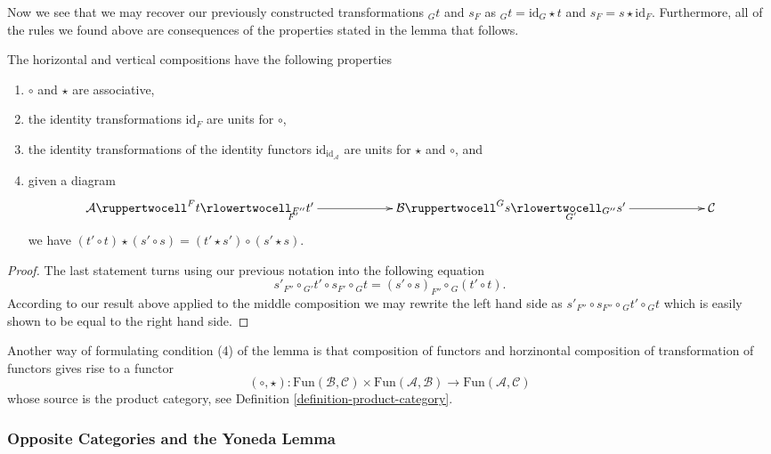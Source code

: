 \noindent
Now we see that we may recover our previously constructed
transformations ${}_Gt$ and $s_F$ as
$ {}_Gt = \text{id}_G \star t $ and $ s_F = s \star \text{id}_F $.
Furthermore, all of the rules we found above are consequences of
the properties stated in the lemma that follows.

\begin{lemma}
\label{lemma-properties-2-cat-cats}
The horizontal and vertical compositions have the following
properties
\begin{enumerate}
\item $\circ$ and $\star$ are associative,
\item the identity transformations $\text{id}_F$ 
are units for $\circ$,
\item the identity transformations of the identity functors
$\text{id}_{\text{id}_{\mathcal{A}}}$
are units for $\star$ and $\circ$, and
\item given a diagram
$$
\xymatrixcolsep{5pc}
\xymatrix{
\mathcal{A}
\ruppertwocell^F{t}
\ar[r]_(.3){F'}
\rlowertwocell_{F''}{t'}
&
\mathcal{B}
\ruppertwocell^G{s}
\ar[r]_(.3){G'}
\rlowertwocell_{G''}{s'}
&
\mathcal{C}
}
$$
we have $ (t' \circ t) \star (s' \circ s) = (t' \star s') \circ
(s' \star s)$.
\end{enumerate}
\end{lemma}

\begin{proof}
The last statement turns using our previous notation into the following
equation
$$
s'_{F''}
\circ
{}_{G'}t' 
\circ
s_{F'}
\circ
{}_Gt 
=
(s' \circ s)_{F''}
\circ
{}_G(t' \circ t).
$$
According to our result above applied to the middle composition
we may rewrite the left hand side as
$
s'_{F''}
\circ
s_{F''} 
\circ
{}_Gt'
\circ
{}_Gt 
$
which is easily shown to be equal to the right hand side.
\end{proof}

\noindent
Another way of formulating condition (4) of the lemma is
that composition of functors and horzinontal composition
of transformation of functors gives rise to a functor
$$
(\circ, \star) :
\text{Fun}(\mathcal{B}, \mathcal{C})
\times 
\text{Fun}(\mathcal{A}, \mathcal{B})
\longrightarrow
\text{Fun}(\mathcal{A}, \mathcal{C})
$$
whose source is the product category,
see Definition \ref{definition-product-category}.

\subsubsection{Opposite Categories and the Yoneda Lemma}
\label{subsubsection-opposite}

